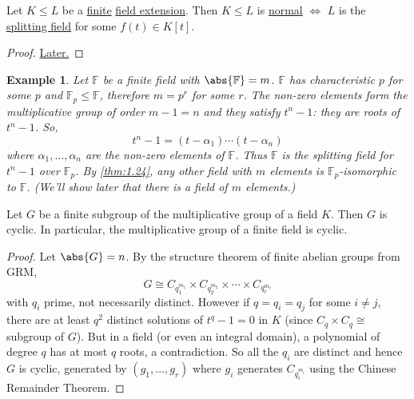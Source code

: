 \documentclass{article}
\newtheorem{nexample}[nthm]{Example}
\newcommand{\F}{\mathbb{F}}
\begin{document}

\begin{nthm}\label{thm:1.26}
    Let $K \leq L$ be a \hyperlink{def:degreeOfFieldExt}{finite} \hyperlink{def:fieldExt}{field extension}. Then $K \leq L$ is \hyperlink{def:normal}{normal} $\iff$ $L$ is the \hyperlink{def:splitting}{splitting field} for some $f(t) \in K[t]$.
\end{nthm}

\begin{proof}
    \hyperlink{prf:1.26}{Later.}
\end{proof}

\begin{nexample}\label{thm:1.27}
    Let $\F$ be a finite field with $\abs{\mathbb{F}} = m$. $\F$ has characteristic $p$ for some $p$ and $\F_p \leq \F$, therefore $m = p^r$ for some $r$.
    The non-zero elements form the multiplicative group of order $m-1=n$ and they satisfy $t^n - 1$: they are roots of $t^n - 1$. So,
    \begin{equation*}
        t^n - 1 = (t - \alpha_1) \dotsm (t-\alpha_n)
    \end{equation*}
    where $\alpha_1, \dotsc, \alpha_n$  are the non-zero elements of $\F$. Thus $\F$ is the splitting field for $t^n - 1$ over $\F_p$.
    By \cref{thm:1.24}, any other field with $m$ elements is $\F_p$-isomorphic to $\F$.
    (We'll show later that there is a field of $m$ elements.)
\end{nexample}

\begin{nthm}\label{thm:1.28}
    Let $G$ be a finite subgroup of the multiplicative group of a field $K$. Then $G$ is cyclic. In particular, the multiplicative group of a finite field is cyclic.
\end{nthm}

\begin{proof}
    Let $\abs{G} = n$. By the structure theorem of finite abelian groups from GRM,
    \begin{equation*}
        G \cong C_{q_1^{m_1}} \times C_{q_2^{m_2}} \times \dotsm \times C_{q_r^{m_r}}
    \end{equation*}
    with $q_i$ prime, not necessarily distinct.
    However if $q = q_i = q_j$ for some $i \neq j$, there are at least $q^2$ distinct solutions of $t^q - 1 = 0$ in $K$ (since $C_q \times C_q \cong$ subgroup of $G$).
    But in a field (or even an integral domain), a polynomial of degree $q$ has at most $q$ roots, a contradiction.
    So all the $q_i$ are distinct and hence $G$ is cyclic, generated by $(g_1, \dotsc, g_r)$ where $g_i$ generates $C_{q_i^{m_i}}$ using the Chinese Remainder Theorem.
\end{proof}
\end{document}
